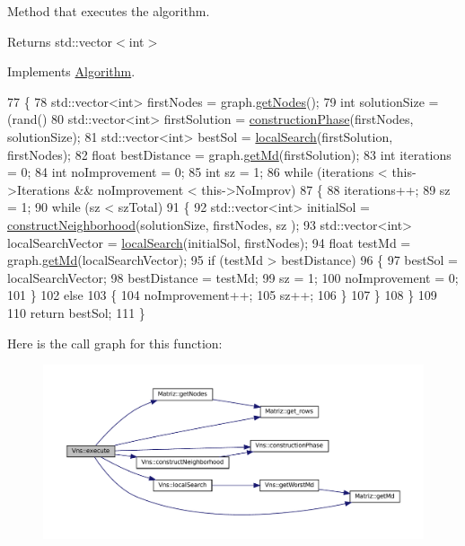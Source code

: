Method that executes the algorithm. 

\begin{DoxyReturn}{Returns}
std\+::vector$<$int$>$ 
\end{DoxyReturn}


Implements \hyperlink{classAlgorithm_af6ea9eb9a6dbd41896e3fd7dabac096b}{Algorithm}.


\begin{DoxyCode}
77 \{
78   std::vector<int> firstNodes = graph.\hyperlink{classMatriz_a394b84a5ec13fd2f4d202ab218680afe}{getNodes}();
79   \textcolor{keywordtype}{int} solutionSize = (rand() %
80   std::vector<int> firstSolution = \hyperlink{classVns_aefd9719db68183a6b2ec871c86226ee4}{constructionPhase}(firstNodes, solutionSize);
81   std::vector<int> bestSol = \hyperlink{classVns_aea2dfebed6019c61f7b7405e198d50ab}{localSearch}(firstSolution, firstNodes);
82   \textcolor{keywordtype}{float} bestDistance = graph.\hyperlink{classMatriz_a8df14a27d791f24206dd633b2a685c5b}{getMd}(firstSolution);
83   \textcolor{keywordtype}{int} iterations = 0;
84   \textcolor{keywordtype}{int} noImprovement = 0;
85   \textcolor{keywordtype}{int} sz = 1;
86   \textcolor{keywordflow}{while} (iterations < this->Iterations && noImprovement < this->NoImprov)
87   \{
88     iterations++;
89     sz = 1;
90     \textcolor{keywordflow}{while} (sz < szTotal)
91     \{
92       std::vector<int> initialSol = \hyperlink{classVns_a8eee9f0e31bb41bcd7bd00c46170e5b9}{constructNeighborhood}(solutionSize, firstNodes, sz
      );
93       std::vector<int> localSearchVector = \hyperlink{classVns_aea2dfebed6019c61f7b7405e198d50ab}{localSearch}(initialSol, firstNodes);
94       \textcolor{keywordtype}{float} testMd = graph.\hyperlink{classMatriz_a8df14a27d791f24206dd633b2a685c5b}{getMd}(localSearchVector);
95       \textcolor{keywordflow}{if} (testMd > bestDistance)
96       \{
97         bestSol = localSearchVector;
98         bestDistance = testMd;
99         sz = 1;
100         noImprovement = 0;
101       \}
102       \textcolor{keywordflow}{else}
103       \{
104         noImprovement++;
105         sz++;
106       \}
107     \}
108   \}
109 
110   \textcolor{keywordflow}{return} bestSol;
111 \}
\end{DoxyCode}
Here is the call graph for this function\+:\nopagebreak
\begin{figure}[H]
\begin{center}
\leavevmode
\includegraphics[width=350pt]{classVns_aece2ea2cb74dd3608570321fcbb2de0c_cgraph}
\end{center}
\end{figure}
